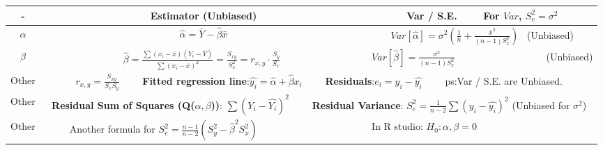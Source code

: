 \documentclass[9pt]{article}
\begin{document}
    \vspace{-0.3cm}
    \begin{longtable}{|c|c|c|}
        \hline
        -        & Estimator (Unbiased)                                                                                                                                                                                                & Var / S.E. \ \ \ \ For $\widehat{Var}$, $S_e^2=\sigma^2$                                      \\
        \hline
        $\alpha$ & $\hat{\alpha}=\bar{Y}-\hat{\beta}\bar{x}$                                                                                                                                                                           & $Var[\hat{\alpha}]=\sigma^2(\frac{1}{n}+\frac{\bar{x}^2}{(n-1)S^2_x})$ \ (Unbiased)           \\
        \hline
        $\beta$  & \ \ \ \ \ \ \ \ \ \ \ \ \ \ \ \  $\hat{\beta}=\frac{\sum(x_i-\overline{x})(Y_i-\overline{Y})}{\sum(x_i-\overline{x})^2}=\frac{S_{xy}}{S_x^2}=r_{x,y}\cdot\frac{S_y}{S_x}$  \ \ \ \ \ \ \ \ \ \ \ \ \ \ \ \                & $Var[\hat{\beta}]=\frac{\sigma^2}{(n-1)S^2_x}$ \ \ \ \ \ \ \ \ \ \ \ \ \ \ \ \ \ \ (Unbiased) \\
        \hline
        Other    & \multicolumn{2}{c|}{$r_{x,y}=\frac{S_{xy}}{S_xS_y}$ \ \ \ \ \textbf{Fitted regression line}:$\hat{y_i}=\hat{\alpha} + \hat{\beta}x_i$ \ \ \ \ \textbf{Residuals}:$e_i=y_i-\hat{y_i}$ \ \ \ \ ps:Var / S.E. are Unbiased.}                                                                                                 \\
        \hline
        Other    & \multicolumn{2}{c|}{\textbf{Residual Sum of Squares (Q($\alpha,\beta$))}: $\sum(Y_i-\hat{Y_i})^2$ \ \ \ \ \textbf{Residual Variance}: $S^2_e=\frac{1}{n-2}\sum(y_i-\hat{y_i})^2$ (Unbiased for $\sigma^2$)}                                                                                                         \\
        \hline
        Other    & \multicolumn{1}{l|}{\ \ \ \ \ Another formula for $S^2_e=\frac{n-1}{n-2}(S^2_y-\hat{\beta}^2S^2_x)$}                                                                                                                & \multicolumn{1}{l|}{In R studio: $H_0:\alpha,\beta=0$}                                        \\
        \hline
    \end{longtable}
    \vspace{-0.4cm}
\end{document}
